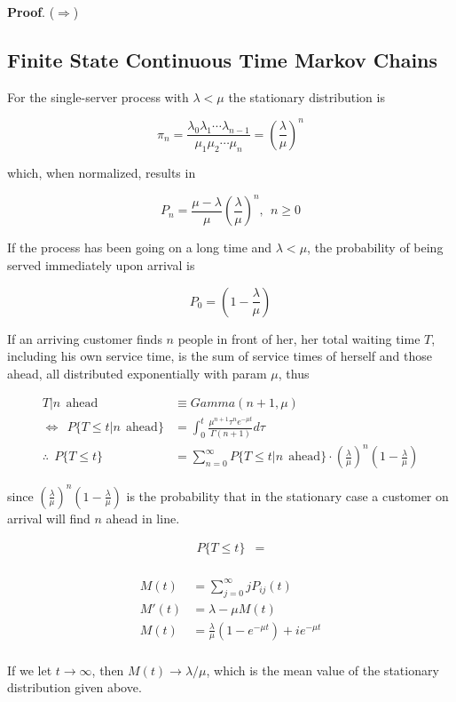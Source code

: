 \documentclass[12pt]{article}
\theoremstyle{nonumberbreak}
\begin{document}
\textbf{Proof}. ($\Rightarrow$) 



\subsection{Finite State Continuous Time Markov Chains}






For the single-server process with $\lambda < \mu$ the stationary distribution is 

$$
\pi_n = \frac{\lambda_0 \lambda_1 \cdots \lambda_{n-1} }{\mu_1 \mu_2 \cdots \mu_n} = (\frac{\lambda}{\mu})^n
$$

which, when normalized, results in

$$
P_n = \frac{\mu - \lambda}{\mu} (\frac{\lambda}{\mu})^n, \ \ n \ge 0
$$


If the process has been going on a long time and $\lambda < \mu$, the probability of being served immediately upon arrival is 

$$
P_0 = (1 - \frac{\lambda}{\mu})
$$


If an arriving customer finds $n$ people in front of her, her total waiting time $T$, including his own service time, is the sum of service times of herself and those ahead, all distributed exponentially with param $\mu$, thus 

$$
\begin{aligned}
T | n \ \ \mathrm{ahead} &\equiv Gamma(n+1, \mu) \\[8pt]
\Leftrightarrow \ \ P \{ T \le t | n \ \ \mathrm{ahead}  \} &= \int_0^t \frac{\mu^{n+1} \tau^n e^{-\mu t} }{\Gamma(n+1)} d\tau \\[10pt]
\therefore \ \ P \{ T \le t\} &= \sum_{n=0}^\infty P \{ T \le t | n \ \ \mathrm{ahead} \} \cdot (\frac{\lambda}{\mu})^n (1 - \frac{\lambda}{\mu})
\end{aligned}
$$  

since $(\frac{\lambda}{\mu})^n (1 - \frac{\lambda}{\mu})$ is the probability that in the stationary case a customer on arrival will find $n$ ahead in line. 


$$
\begin{aligned}
P \{ T \le t\} &= \\[8pt]
\end{aligned}
$$



$$
\begin{aligned}
M(t) &= \sum_{j=0}^\infty j P_{ij}(t) \\[8pt]
M'(t) &= \lambda - \mu M(t) \\[8pt]
M(t) &= \frac{\lambda}{\mu} (1 - e^{-\mu t}) + i e^{-\mu t} \\[8pt]
\end{aligned}
$$

If we let $t \to \infty$, then $M(t) \to \lambda/\mu$, which is the mean value of the stationary distribution given above. 
\end{document}
